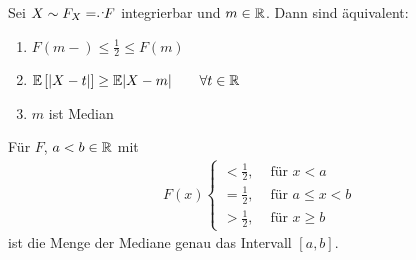 \begin{lemma}\label{lemma: median}
	Sei $X \sim F_X \defqe F$ integrierbar und $m \in \mathbb{R}$. Dann sind äquivalent:
	\begin{enumerate}[label=(\arabic*)]
		\item \label{it:medianHalf} $F(m-)\le \frac{1}{2} \le F(m)$
		\item \label{it:medianMin} $\mathbb{E}\left[ \left| X-t \right| \right]\ge\mathbb{E}{\left| X-m \right|} \qquad\forall t \in \mathbb{R}$
		\item \label{it:medianMedian} $m$ ist Median
	\end{enumerate}
\end{lemma}
\begin{beispiel}
	Für $F$, $a < b \in \mathbb{R}$ mit
	\begin{align*}
		F(x) \begin{cases}
			< \frac12, &\text{ für } x < a \\
			= \frac12, &\text{ für } a \le x < b \\
			> \frac12, &\text{ für } x \ge b
		\end{cases}
	\end{align*}
	ist die Menge der Mediane genau das Intervall $[a, b]$.
\end{beispiel}

